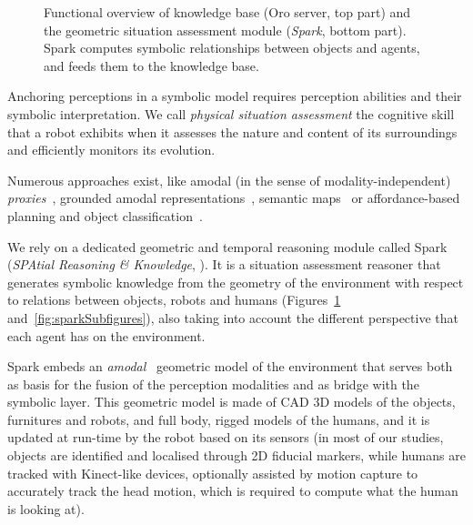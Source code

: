 \documentclass[preprint,3p,times]{elsarticle}
\begin{document}
\begin{figure}
{
}
    \caption{Functional overview of knowledge base ({\sc Oro} server, top part)
    and the geometric situation assessment module (\emph{{\sc Spark}}, bottom
    part). {\sc Spark} computes symbolic relationships between objects and
    agents, and feeds them to the knowledge base.}

        \label{fig|spark-oro}
\end{figure}

Anchoring perceptions in a symbolic model requires perception abilities and
their symbolic interpretation. We call \emph{physical situation assessment} the
cognitive skill that a robot exhibits when it assesses the nature and content of its
surroundings and efficiently monitors its evolution.

Numerous approaches exist, like amodal (in the sense of modality-independent)
\emph{proxies}~\cite{Jacobsson2008}, grounded amodal
representations~\cite{Mavridis2006}, semantic
maps~\cite{Nuechter2008, Galindo2008,Blodow2011} or affordance-based planning
and object classification~\cite{Lorken2008, Varadarajan2011}.



We rely on a dedicated geometric and temporal reasoning module called {\sc
Spark} (\emph{SPAtial Reasoning \& Knowledge}, \cite{Sisbot2011}). It is a
situation assessment reasoner that generates symbolic knowledge from the
geometry of the environment with respect to relations between objects,
robots and humans (Figures~\ref{fig|spark-oro}
and~\ref{fig:sparkSubfigures}), also taking into account the different
perspective that each agent has on the environment.

{\sc Spark} embeds an \emph{amodal}~\cite{Mavridis2006} geometric model of the
environment that serves both as basis for the fusion of the perception
modalities and as bridge with the symbolic layer. This geometric model is made
of CAD 3D models of the objects, furnitures and robots, and full body, rigged
models of the humans, and it is updated at run-time by the robot based on its
sensors (in most of our studies, objects are identified and localised through 2D
fiducial markers, while humans are tracked with Kinect-like devices, optionally
assisted by motion capture to accurately track the head motion, which is
required to compute what the human is looking at).
\end{document}

